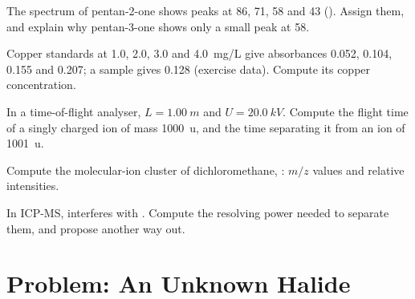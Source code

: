 \begin{exercise}[$\star\star$]\label{exo:b2:mass-spec-atomic:8}
The spectrum of pentan-2-one shows peaks at 86, 71, 58 and 43 (). Assign them, and explain
why pentan-3-one shows only a small peak at 58.
\end{exercise}

\begin{exercise}[$\star\star$]\label{exo:b2:mass-spec-atomic:9}
Copper standards at 1.0, 2.0, 3.0 and \qty{4.0}{mg/L} give absorbances 0.052, 0.104, 0.155 and 0.207;
a sample gives 0.128 (exercise data). Compute its copper concentration.
\end{exercise}

\begin{exercise}[$\star\star\star$]\label{exo:b2:mass-spec-atomic:10}
In a time-of-flight analyser, $L = \qty{1.00}{m}$ and $U = \qty{20.0}{kV}$. Compute the flight time of
a singly charged ion of mass \qty{1000}{u}, and the time separating it from an ion of \qty{1001}{u}.
\end{exercise}

\begin{exercise}[$\star\star\star$]\label{exo:b2:mass-spec-atomic:11}
Compute the molecular-ion cluster of dichloromethane, : $m/z$ values and relative
intensities.
\end{exercise}

\begin{exercise}[$\star\star\star$]\label{exo:b2:mass-spec-atomic:12}
In ICP-MS,  interferes with . Compute the resolving power needed to
separate them, and propose another way out.
\end{exercise}

\section{Problem: An Unknown Halide}

